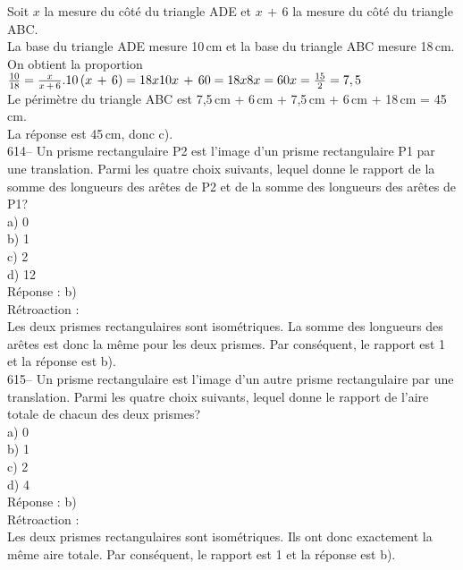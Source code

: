 ﻿\documentclass[letterpaper, 12pt]{article}
\begin{document}
Soit $x$ la mesure du c\^ot\'e du triangle ADE et $x\,+\,6$ la mesure du
c\^ot\'e du triangle ABC.  \\
La base du triangle ADE mesure 10\,cm et la base du triangle ABC mesure
18\,cm.\\[2mm]
On obtient la proportion $\frac{10}{18}=\frac{x}{x\,+\,6}.\\[2mm]
10\left( x\,+\,6\right) =18x\\[2mm]
10x\,+\,60=18x\\[2mm]
8x=60\\[2mm]
x=\frac{15}{2}=7,5$\\[2mm]
Le p\'erim\`etre du triangle ABC est 7,5\,cm + 6\,cm + 7,5\,cm + 6\,cm +
18\,cm = 45\,cm.\\[2mm]
La r\'eponse est 45\,cm, donc c).\\

614-- Un prisme rectangulaire P2 est l'image d'un prisme rectangulaire P1
par une translation.  Parmi les quatre choix suivants, lequel donne le
rapport de la somme des longueurs des ar\^etes de P2 et de la somme des
longueurs des ar\^etes de P1?\\
a) 0\\
b) 1\\
c) 2\\
d) 12\\

R\'eponse : b)\\

R\'etroaction : \\
Les deux prismes rectangulaires sont isom\'etriques.  La somme des longueurs
des ar\^etes est donc la m\^eme pour les deux prismes.  Par cons\'equent, le
rapport est 1 et la r\'eponse est b).\\

615-- Un prisme rectangulaire est l'image d'un autre prisme rectangulaire
par une translation.  Parmi les quatre choix suivants, lequel donne le
rapport de l'aire totale de chacun des deux prismes?\\
a) 0\\
b) 1\\
c) 2\\
d) 4\\

R\'eponse : b)\\

R\'etroaction : \\
Les deux prismes rectangulaires sont isom\'etriques.  Ils ont donc
exactement la m\^eme aire totale.  Par cons\'equent, le rapport est 1 et la
r\'eponse est b).\\
\end{document}
